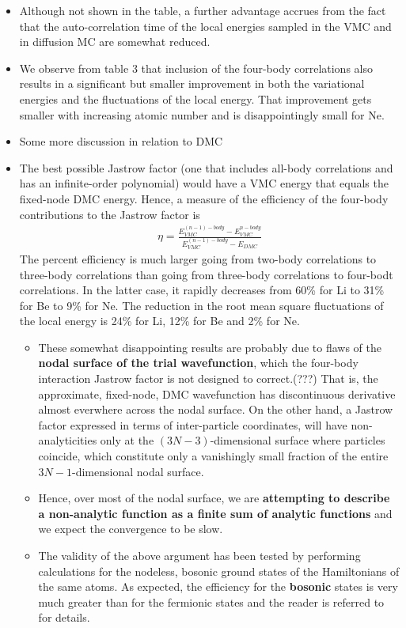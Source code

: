 \documentclass[twoside,english]{uiofysmaster}
\begin{document}
\begin{itemize}
\begin{itemize}
		\item Although not shown in the table, a further advantage accrues from the fact that the auto-correlation time of the local energies sampled in the VMC and in diffusion MC are somewhat reduced. 
		\item We observe from table 3 that inclusion of the four-body correlations also results in a significant but smaller improvement in both the variational energies and the fluctuations of the local energy. That improvement gets smaller with increasing atomic number and is disappointingly small for Ne.
		\item Some more discussion in relation to DMC
		\item The best possible Jastrow factor (one that includes all-body correlations and has an infinite-order polynomial) would have a VMC energy that equals the fixed-node DMC energy. Hence, a measure of the efficiency of the four-body contributions to the Jastrow factor is
		\begin{align}
			\eta = \frac{ E_{VMC}^{(n-1)-body} - E_{VMC}^{n-body} }{ E_{VMC}^{(n-1)-body} - E_{DMC} }
		\end{align}
		The percent efficiency is much larger going from two-body correlations to three-body correlations than going from three-body correlations to four-bodt correlations. In the latter case, it rapidly decreases from 60\% for Li to 31\% for Be to 9\% for Ne. The reduction in the root mean square fluctuations of the local energy is 24\% for Li, 12\% for Be and 2\% for Ne. 
		\begin{itemize}
			\item These somewhat disappointing results are probably due to flaws of the \textbf{nodal surface of the trial wavefunction}, which the four-body interaction Jastrow factor is not designed to correct.(???) That is, the approximate, fixed-node, DMC wavefunction has discontinuous derivative almost everwhere across the nodal surface. On the other hand, a Jastrow factor expressed in terms of inter-particle coordinates, will have non-analyticities only at the $(3N-3)$-dimensional surface where particles coincide, which constitute only a vanishingly small fraction of the entire $3N-1$-dimensional nodal surface.
			\item Hence, over most of the nodal surface, we are \textbf{attempting to describe a non-analytic function as a finite sum of analytic functions} and we expect the convergence to be slow. 
			\item The validity of the above argument has been tested by performing calculations for the nodeless, bosonic ground states of the Hamiltonians of the same atoms. As expected, the efficiency for the \textbf{bosonic} states is very much greater than for the fermionic states and the reader is referred to \cite{Huang1997} for details.

\end{itemize}
\end{itemize}
\end{itemize}
\end{document}
